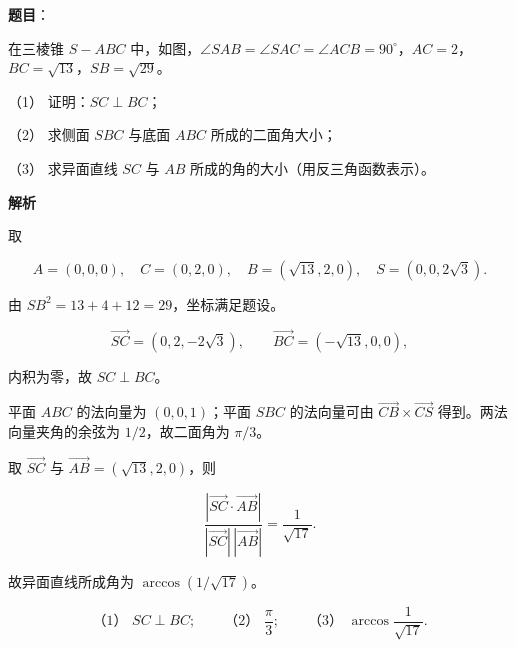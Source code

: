 \begin{answer}

\textbf{题目}：

在三棱锥 $S-ABC$ 中，如图，$\angle SAB=\angle SAC=\angle ACB=90^\circ$，$AC=2$，$BC=\sqrt{13}$，$SB=\sqrt{29}$。
\nopagebreak[4]
\begin{center}\end{center}
\nopagebreak[4]
（1） 证明：$SC\perp BC$；

（2） 求侧面 $SBC$ 与底面 $ABC$ 所成的二面角大小；

（3） 求异面直线 $SC$ 与 $AB$ 所成的角的大小（用反三角函数表示）。

\textbf{解析}

取

\nopagebreak[4]
\[
A=(0,0,0),\quad C=(0,2,0),\quad B=(\sqrt{13},2,0),\quad S=(0,0,2\sqrt3).
\]

由 $SB^2=13+4+12=29$，坐标满足题设。


\nopagebreak[4]
\[
\overrightarrow{SC}=(0,2,-2\sqrt3),\qquad
\overrightarrow{BC}=(-\sqrt{13},0,0),
\]

内积为零，故 $SC\perp BC$。


平面 $ABC$ 的法向量为 $(0,0,1)$；平面 $SBC$ 的法向量可由 $\overrightarrow{CB}\times\overrightarrow{CS}$ 得到。两法向量夹角的余弦为 $1/2$，故二面角为 $\pi/3$。


取 $\overrightarrow{SC}$ 与 $\overrightarrow{AB}=(\sqrt{13},2,0)$，则

\nopagebreak[4]
\[
\frac{|\overrightarrow{SC}\cdot\overrightarrow{AB}|}
{|\overrightarrow{SC}|\,|\overrightarrow{AB}|}
=\frac1{\sqrt{17}}.
\]

故异面直线所成角为 $\arccos(1/\sqrt{17})$。

\nopagebreak[4]
\[
\text{（1） }SC\perp BC;\qquad
\text{（2） }\frac\pi3;\qquad
\text{（3） }\arccos\frac1{\sqrt{17}}.
\]




\end{answer}
